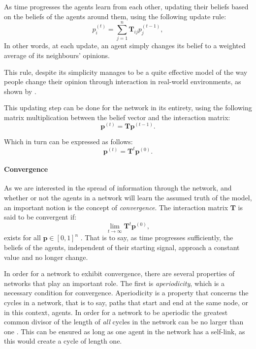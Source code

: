 \documentclass[a4paper, 12pt]{report}
\newcommand{\T}{\bm{T}}
\newcommand{\Tij}{\T_{ij}}
\newcommand{\beli}[3][2]{p_{#2}^{(#3)}}
\begin{document}
As time progresses the agents learn from each other, updating their beliefs based on the beliefs of the agents around them, using the following update rule:
\begin{equation}
    \label{updating:standard}
    \beli{i}{t} = \sum_{j=1}^{n}\Tij\beli{j}{t-1},
\end{equation}
In other words, at each update, an agent simply changes its belief to a weighted average of its neighbours' opinions. 

This rule, despite its simplicity manages to be a quite effective model of the way people change their opinion through interaction in real-world environments, as shown by \cite{demarzo2003changing}.

This updating step can be done for the network in its entirety, using the following matrix multiplication between the belief vector and the interaction matrix:
\begin{equation*}
    \bm{p}^{(t)} = \T\bm{p}^{(t-1)}.
\end{equation*}

Which in turn can be expressed as follows:
\begin{equation*}
    \label{updating:alt}
    \bm{p}^{(t)} = \T^{t}\bm{p}^{(0)}.
\end{equation*}

\newpage

\paragraph{Convergence}
\label{convergence:general}
As we are interested in the spread of information through the network, and whether or not the agents in a network will learn the assumed truth of the model, an important notion is the concept of \emph{convergence}. The interaction matrix $\T$ is said to be convergent if:
\begin{equation*}
    \lim_{t\to\infty} \T^t\bm{p}^{(0)},
\end{equation*}
exists for all $\bm{p} \in [0, 1]^n$ \parencite{degroot1974concensus}. That is to say, as time progresses sufficiently, the beliefs of the agents, independent of their starting signal, approach a constant value and no longer change.

In order for a network to exhibit convergence, there are several properties of networks that play an important role. The first is \emph{aperiodicity}, which is a necessary condition for convergence. Aperiodicity is a property that concerns the cycles in a network, that is to say, paths that start and end at the same node, or in this context, agents. In order for a network to be aperiodic the greatest common divisor of the length of \emph{all} cycles in the network can be no larger than one \parencite{degroot1974concensus}. This can be ensured as long as one agent in the network has a self-link, as this would create a cycle of length one.
\end{document}
